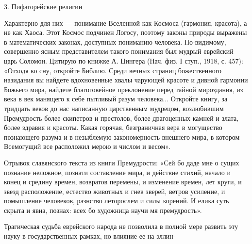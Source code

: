 3. Пифагорейские религии

Характерно для них --- понимание Вселенной как Космоса (гармония, красота), а не
как Хаоса. Этот Космос подчинен Логосу, поэтому законы природы выражены в
математических законах, доступных пониманию человека. По-видимому,
совершенно ясным представителем такого понимания был мудрый еврейский царь
Соломон. Цитирую по книжке А. Цингера (Нач. физ. I ступ., 1918, с. 457):
«Отходя ко сну, откройте Библию. Среди вечных страниц божественного
назидания вы найдете вдохновенные хвалы чарующей красоте и дивной гармонии
Божьего мира, найдете благоговейное преклонение перед тайной мироздания, из
века в век манящего к себе пытливый разум человека... Откройте книгу, за
тридцать веков до нас написанную царственным мудрецом, возлюбившим
Премудрость более скипетров и престолов, более драгоценных камней и злата,
более здравия и красоты. Какая горячая, безграничная вера в могущество
познающего разума и в незыблемую закономерность внешнего мира, в котором
Всемогущий все расположил мерою и числом и весом».

Отрывок славянского текста из книги Премудрости: «Сей бо даде мне о сущих
познание неложное, познати составление мира, и действие стихий, начало и
конец и средину времен, возвратов перемены, и изменение времен, лет круги, и
звезд расположение, естество животных и гнев зверей, ветров усиление, и
помышление человеков, разнство леторослем и силы корений. И елика суть
скрыта и явна, познах: всех бо художница научи мя премудрость».

Трагическая судьба еврейского народа не позволила в полной мере развить эту
науку в государственных рамках, но влияние ее на эллин-
